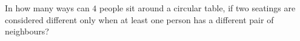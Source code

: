 In how many ways can $4$ people sit around a circular table, if two seatings are considered different only when at least one person has a different pair of neighbours?
